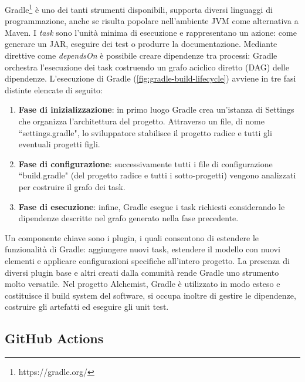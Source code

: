 Gradle\footnote{https://gradle.org/} è uno dei tanti strumenti disponibili, supporta diversi linguaggi di programmazione, anche se risulta popolare nell'ambiente JVM come alternativa a Maven. I \textit{task} sono l'unità minima di esecuzione e rappresentano un azione: come generare un JAR, eseguire dei test o produrre la documentazione. Mediante direttive come \textit{dependsOn} è possibile creare dipendenze tra processi: Gradle orchestra l'esecuzione dei task costruendo un grafo aciclico diretto (DAG) delle dipendenze. L'esecuzione di Gradle (\cref{fig:gradle-build-lifecycle}) avviene in tre fasi distinte elencate di seguito:


\begin{enumerate}
	\item \textbf{Fase di inizializzazione}: in primo luogo Gradle crea un'istanza di Settings che organizza l'architettura del progetto. Attraverso un file, di nome ``settings.gradle", lo sviluppatore stabilisce il progetto radice e tutti gli eventuali progetti figli. 
	\item \textbf{Fase di configurazione}: successivamente tutti i file di configurazione ``build\-.\-gradle" (del progetto radice e tutti i sotto-progetti) vengono analizzati per costruire il grafo dei task.
	\item \textbf{Fase di esecuzione}: infine, Gradle esegue i task richiesti considerando le dipendenze descritte nel grafo generato nella fase precedente.
\end{enumerate}

Un componente chiave sono i plugin, i quali consentono di estendere le funzionalità di Gradle: aggiungere nuovi task, estendere il modello con nuovi elementi e applicare configurazioni specifiche all'intero progetto. La presenza di diversi plugin base e altri creati dalla comunità rende Gradle uno strumento molto versatile. Nel progetto Alchemist, Gradle è utilizzato in modo esteso e costituisce il build system del software, si occupa inoltre di gestire le dipendenze, costruire gli artefatti ed eseguire gli unit test.

\subsection{GitHub Actions}


